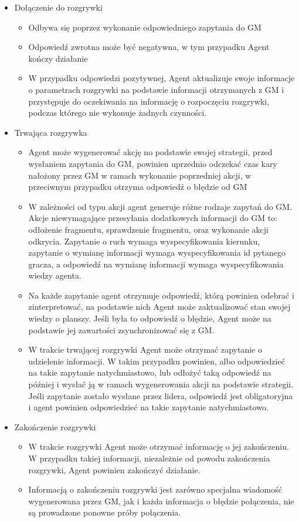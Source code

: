 \documentclass[../Dokumentacja.tex]{subfiles}
\begin{document}
\begin{itemize}
    \item Dołączenie do rozgrywki
    \begin{itemize}
        \item Odbywa się poprzez wykonanie odpowiedniego zapytania do GM
        \item Odpowiedź zwrotna może być negatywna, w tym przypadku Agent kończy działanie
        \item W przypadku odpowiedzi pozytywnej, Agent aktualizuje swoje informacje o parametrach rozgrywki na podstawie informacji otrzymanych z GM i przystępuje do oczekiwania na informację o rozpoczęciu rozgrywki, podczas którego nie wykonuje żadnych czynności.
    \end{itemize}

    \item Trwająca rozgrywka
    \begin{itemize}
        \item Agent może wygenerować akcję no podstawie swojej strategii, przed wysłaniem zapytania do GM, powinien uprzednio odczekać czas kary nałożony przez GM w ramach wykonanie poprzedniej akcji, w przeciwnym przypadku otrzyma odpowiedź o błędzie od GM
        \item W zależności od typu akcji agent generuje różne rodzaje zapytań do GM. Akcje niewymagające przesyłania dodatkowych informacji do GM to: odłożenie fragmentu, sprawdzenie fragmentu, oraz wykonanie akcji odkrycia. Zapytanie o ruch wymaga wyspecyfikowania kierunku, zapytanie o wymianę informacji wymaga wyspecyfikowania id pytanego gracza, a odpowiedź na wymianę informacji wymaga wyspecyfikowania wiedzy agenta.
        \item Na każde zapytanie agent otrzymuje odpowiedź, którą powinien odebrać i zinterpretować, na podstawie nich Agent może zaktualizować stan swojej wiedzy o planszy. Jeśli była to odpowiedź o błędzie, Agent może na podstawie jej zawartości zsynchronizować się z GM.
        \item W trakcie trwającej rozgrywki Agent może otrzymać zapytanie o udzielenie informacji. W takim przypadku powinien, albo odpowiedzieć na takie zapytanie natychmiastowo, lub odłożyć taką odpowiedź na później i wysłać ją w ramach wygenerowania akcji na podstawie strategii. Jeśli zapytanie zostało wysłane przez lidera, odpowiedź jest obligatoryjna i agent powinien odpowiedzieć na takie zapytanie natychmiastowo.
    \end{itemize}
    \item Zakończenie rozgrywki
    \begin{itemize}
        \item W trakcie rozgrywki Agent może otrzymać informację o jej zakończeniu. W przypadku takiej informacji, niezależnie od powodu zakończenia rozgrywki, Agent powinien zakończyć działanie.
        \item Informacją o zakończeniu rozgrywki jest zarówno specjalna wiadomość wygenerowana przez GM, jak i każda informacja o błędzie połączenia, nie są prowadzone ponowne próby połączenia.
    \end{itemize}
\end{itemize}
\end{document}
